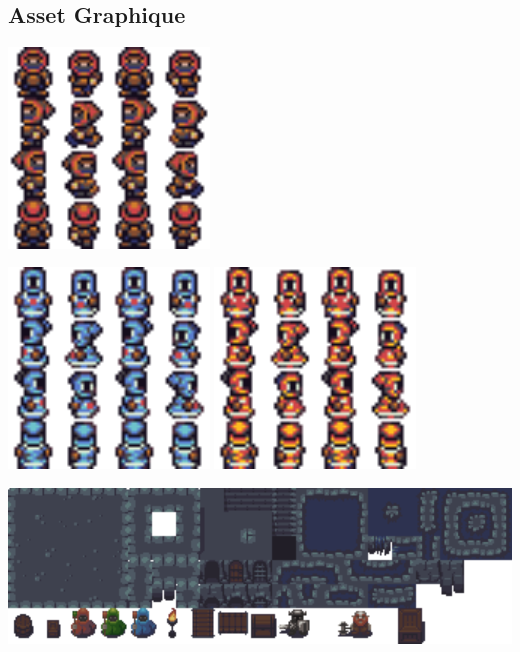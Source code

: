 \documentclass[a4page, 14pt]{extarticle}
\begin{document}
    \subsection{Asset Graphique}
    \begin{center}
      \includegraphics[width=0.4\textwidth]{images/Rogue.png}
    \end{center}
    \begin{center}
          \includegraphics[width=0.4\textwidth]{images/Mage.png}
             \includegraphics[width=0.4\textwidth]{images/MageRed.png}
    \end{center}

\begin{center}
      \includegraphics[width=16cm]{images/dungeon_tiles_compact_and_varied.png}
    \end{center}

\newpage
\renewcommand{\listfigurename}{Liste des Figures}
\renewcommand{\listtablename}{Liste des Tables}

\listoftables
\listoffigures
\end{document}
